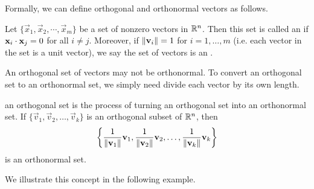 \documentclass{ximera}
\begin{document}
Formally, we can define orthogonal and orthonormal vectors as follows.

\begin{definition}\label{orthset}
Let $\{ \vec{x}_1, \vec{x}_2, \cdots, \vec{x}_m \}$ be a set of nonzero
vectors in $\mathbb{R}^n$. Then this set is called an
 if 
$\mathbf{x}_i \cdot \mathbf{x}_j = 0$ for all $i \neq j$.
Moreover, if $\left\lVert\mathbf{v}_i\right\rVert=1$ for $i=1,\ldots,m$ (i.e. each vector in the set is a unit vector), we say the set of vectors is an .
\end{definition}

An orthogonal set of vectors may not be orthonormal.  To convert an orthogonal set to an orthonormal set, we simply need divide each vector by its own length.

\begin{definition}\label{normalizing}
 an orthogonal set is the process of turning an orthogonal set into an orthonormal set.
If $\{ \vec{v}_1, \vec{v}_2, \ldots, \vec{v}_k\}$
is an orthogonal subset of $\mathbb{R}^n$,
then
\[ \left\{
\frac{1}{\left\lVert\mathbf{v}_1\right\rVert}\mathbf{v}_1,
\frac{1}{\left\lVert\mathbf{v}_2\right\rVert}\mathbf{v}_2, \ldots,
\frac{1}{\left\lVert\mathbf{v}_k\right\rVert}\mathbf{v}_k \right\}
\]
is an orthonormal set.
\end{definition}

We illustrate this concept in the following example.
\end{document}
